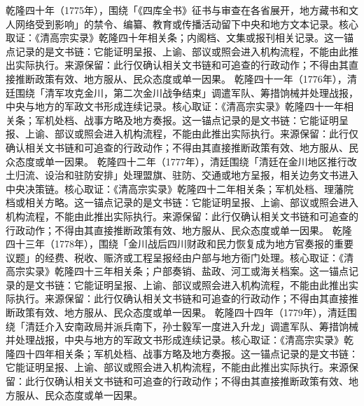 乾隆四十年（1775年），围绕「《四库全书》征书与审查在各省展开，地方藏书和文人网络受到影响」的禁令、编纂、教育或传播活动留下中央和地方文本记录。核心取证：《清高宗实录》乾隆四十年相关条；内阁档、文集或报刊相关记录。这一锚点记录的是文书链：它能证明呈报、上谕、部议或照会进入机构流程，不能由此推出实际执行。来源保留：此行仅确认相关文书链和可追查的行政动作；不得由其直接推断政策有效、地方服从、民众态度或单一因果。
乾隆四十一年（1776年），清廷围绕「清军攻克金川，第二次金川战争结束」调遣军队、筹措饷械并处理战报，中央与地方的军政文书形成连续记录。核心取证：《清高宗实录》乾隆四十一年相关条；军机处档、战事方略及地方奏报。这一锚点记录的是文书链：它能证明呈报、上谕、部议或照会进入机构流程，不能由此推出实际执行。来源保留：此行仅确认相关文书链和可追查的行政动作；不得由其直接推断政策有效、地方服从、民众态度或单一因果。
乾隆四十二年（1777年），清廷围绕「清廷在金川地区推行改土归流、设治和驻防安排」处理盟旗、驻防、交通或地方呈报，相关边务文书进入中央决策链。核心取证：《清高宗实录》乾隆四十二年相关条；军机处档、理藩院档或相关方略。这一锚点记录的是文书链：它能证明呈报、上谕、部议或照会进入机构流程，不能由此推出实际执行。来源保留：此行仅确认相关文书链和可追查的行政动作；不得由其直接推断政策有效、地方服从、民众态度或单一因果。
乾隆四十三年（1778年），围绕「金川战后四川财政和民力恢复成为地方官奏报的重要议题」的经费、税收、赈济或工程呈报经由户部与地方衙门处理。核心取证：《清高宗实录》乾隆四十三年相关条；户部奏销、盐政、河工或海关档案。这一锚点记录的是文书链：它能证明呈报、上谕、部议或照会进入机构流程，不能由此推出实际执行。来源保留：此行仅确认相关文书链和可追查的行政动作；不得由其直接推断政策有效、地方服从、民众态度或单一因果。
乾隆四十四年（1779年），清廷围绕「清廷介入安南政局并派兵南下，孙士毅军一度进入升龙」调遣军队、筹措饷械并处理战报，中央与地方的军政文书形成连续记录。核心取证：《清高宗实录》乾隆四十四年相关条；军机处档、战事方略及地方奏报。这一锚点记录的是文书链：它能证明呈报、上谕、部议或照会进入机构流程，不能由此推出实际执行。来源保留：此行仅确认相关文书链和可追查的行政动作；不得由其直接推断政策有效、地方服从、民众态度或单一因果。
